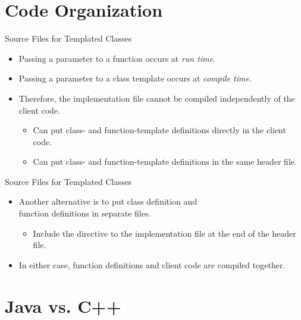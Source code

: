 \documentclass[14pt,aspectratio=1610, hyperref={pdfpagelayout=SinglePage}]{beamer}
\begin{document}
\section{Code Organization}

\begin{frame}{Source Files for Templated Classes}
\protect\hypertarget{header-file-and-implementation-file-of-a-class-template-1-of-2}{}
\begin{itemize}
\item
  Passing a parameter to a function occurs at \emph{run time}.
\item
  Passing a parameter to a class template occurs at \emph{compile time}.
\item
  Therefore, the implementation file cannot be compiled independently of the client
  code.
  \begin{itemize}
  \item
    Can put class- and function-template definitions
    directly in the client code.
  \item
    Can put class- and function-template definitions
    in the same header file.
  \end{itemize}
\end{itemize}
\end{frame}

\begin{frame}{Source Files for Templated Classes}
\protect\hypertarget{header-file-and-implementation-file-of-a-class-template-2-of-2}{}
\begin{itemize}
\item
  Another alternative is to put class definition and\\
  function definitions in separate files.
  \begin{itemize}
  \item
    Include the directive to the implementation file at the end of the header
    file.
  \end{itemize}
\item
  In either case, function definitions and client code are compiled
  together.
\end{itemize}
\end{frame}

\section{Java vs. C++}
\end{document}
